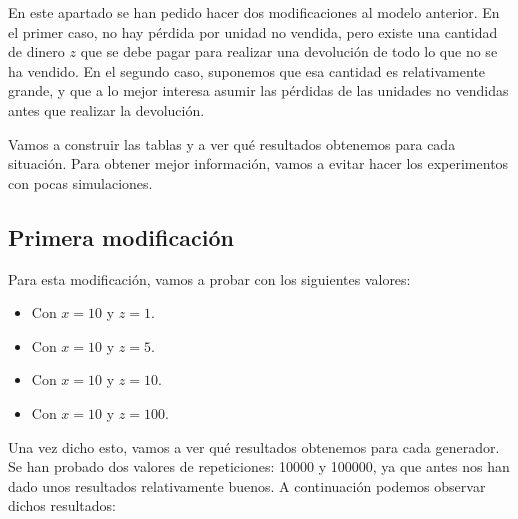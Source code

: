 \documentclass[11pt,a4paper]{report}
\begin{document}
En este apartado se han pedido hacer dos modificaciones al modelo anterior. En el primer caso, no hay pérdida por unidad no
vendida, pero existe una cantidad de dinero $z$ que se debe pagar para realizar una devolución de todo lo que no se
ha vendido. En el segundo caso, suponemos que esa cantidad es relativamente grande, y que a lo mejor interesa asumir las pérdidas
de las unidades no vendidas antes que realizar la devolución.

Vamos a construir las tablas y a ver qué resultados obtenemos para cada situación. Para obtener mejor información, vamos a
evitar hacer los experimentos con pocas simulaciones.

\subsection{Primera modificación}

Para esta modificación, vamos a probar con los siguientes valores:

\begin{itemize}
	\item Con $x = 10$ y $z = 1$.
	\item Con $x = 10$ y $z = 5$.
	\item Con $x = 10$ y $z = 10$.
	\item Con $x = 10$ y $z = 100$.
\end{itemize}


Una vez dicho esto, vamos a ver qué resultados obtenemos para cada generador. Se han probado dos valores de repeticiones:
10000 y 100000, ya que antes nos han dado unos resultados relativamente buenos. A continuación podemos observar dichos
resultados:
\end{document}
